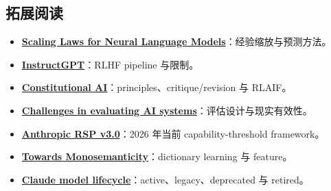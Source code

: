 \documentclass[a4paper]{article}
\begin{document}
\subsection{拓展阅读}

{\small
\begin{itemize}[nosep,leftmargin=*]
  \item \href{https://arxiv.org/abs/2001.08361}{\textbf{Scaling Laws for Neural Language Models}}：经验缩放与预测方法。
  \item \href{https://arxiv.org/abs/2203.02155}{\textbf{InstructGPT}}：RLHF pipeline 与限制。
  \item \href{https://www.anthropic.com/research/constitutional-ai-harmlessness-from-ai-feedback}{\textbf{Constitutional AI}}：principles、critique/revision 与 RLAIF。
  \item \href{https://www.anthropic.com/research/evaluating-ai-systems}{\textbf{Challenges in evaluating AI systems}}：评估设计与现实有效性。
  \item \href{https://www.anthropic.com/responsible-scaling-policy/rsp-v3-0}{\textbf{Anthropic RSP v3.0}}：2026 年当前 capability-threshold framework。
  \item \href{https://www.anthropic.com/research/towards-monosemanticity-decomposing-language-models-with-dictionary-learning}{\textbf{Towards Monosemanticity}}：dictionary learning 与 feature。
  \item \href{https://docs.anthropic.com/en/docs/about-claude/model-deprecations}{\textbf{Claude model lifecycle}}：active、legacy、deprecated 与 retired。
\end{itemize}
}
\end{document}
